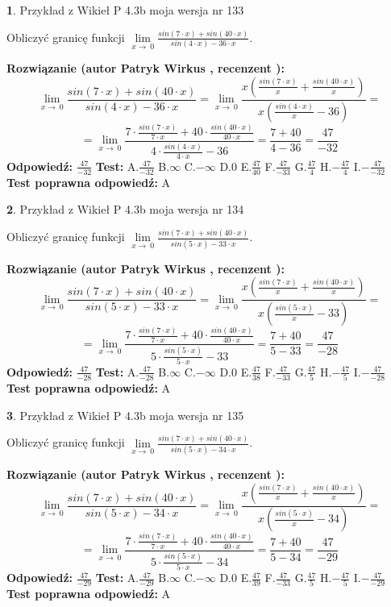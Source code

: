 \documentclass[12pt, a4paper]{article}
\theoremstyle{definition} %
\newtheorem{zad}{}
\newcommand{\zadStart}[1]{\begin{zad}#1\newline}
\newcommand{\zadStop}{\end{zad}}
\newcommand{\rozwStart}[2]{\noindent \textbf{Rozwiązanie (autor #1 , recenzent #2): }\newline}
\newcommand{\rozwStop}{\newline}
\newcommand{\odpStart}{\noindent \textbf{Odpowiedź:}\newline}
\newcommand{\odpStop}{\newline}
\newcommand{\testStart}{\noindent \textbf{Test:}\newline}
\newcommand{\testStop}{\newline}
\newcommand{\kluczStart}{\noindent \textbf{Test poprawna odpowiedź:}\newline}
\newcommand{\kluczStop}{\newline}
\begin{document}
\zadStart{Przykład z Wikieł P 4.3b moja wersja nr 133}


Obliczyć granicę funkcji $\lim\limits_{x\to\ 0}\frac{sin(7 \cdot x)+sin(40 \cdot x)}{sin(4 \cdot x)-36 \cdot x}$.
\zadStop
\rozwStart{Patryk Wirkus}{}
$$\lim\limits_{x\to\ 0}\frac{sin(7 \cdot x)+sin(40 \cdot x)}{sin(4 \cdot x)-36 \cdot x}=\lim\limits_{x\to\ 0}\frac{x(\frac{sin(7 \cdot x)}{x}+\frac{sin(40 \cdot x)}{x})}{x(\frac{sin(4 \cdot x)}{x}-36)}=$$
$$=\lim\limits_{x\to\ 0}\frac{7 \cdot \frac{sin(7 \cdot x)}{7 \cdot x}+40 \cdot \frac{sin(40 \cdot x)}{40 \cdot x}}{4 \cdot \frac{sin(4 \cdot x)}{4 \cdot x}-36}=\frac{7+40}{4-36} = \frac{47}{-32}$$
\rozwStop
\odpStart
$\frac{47}{-32}$
\odpStop
\testStart
A.$\frac{47}{-32}$
B.$\infty$
C.$-\infty$
D.$0$
E.$\frac{47}{40}$
F.$\frac{47}{-33}$
G.$\frac{47}{4}$
H.$-\frac{47}{4}$
I.$-\frac{47}{-32}$
\testStop
\kluczStart
A
\kluczStop



\zadStart{Przykład z Wikieł P 4.3b moja wersja nr 134}


Obliczyć granicę funkcji $\lim\limits_{x\to\ 0}\frac{sin(7 \cdot x)+sin(40 \cdot x)}{sin(5 \cdot x)-33 \cdot x}$.
\zadStop
\rozwStart{Patryk Wirkus}{}
$$\lim\limits_{x\to\ 0}\frac{sin(7 \cdot x)+sin(40 \cdot x)}{sin(5 \cdot x)-33 \cdot x}=\lim\limits_{x\to\ 0}\frac{x(\frac{sin(7 \cdot x)}{x}+\frac{sin(40 \cdot x)}{x})}{x(\frac{sin(5 \cdot x)}{x}-33)}=$$
$$=\lim\limits_{x\to\ 0}\frac{7 \cdot \frac{sin(7 \cdot x)}{7 \cdot x}+40 \cdot \frac{sin(40 \cdot x)}{40 \cdot x}}{5 \cdot \frac{sin(5 \cdot x)}{5 \cdot x}-33}=\frac{7+40}{5-33} = \frac{47}{-28}$$
\rozwStop
\odpStart
$\frac{47}{-28}$
\odpStop
\testStart
A.$\frac{47}{-28}$
B.$\infty$
C.$-\infty$
D.$0$
E.$\frac{47}{38}$
F.$\frac{47}{-33}$
G.$\frac{47}{5}$
H.$-\frac{47}{5}$
I.$-\frac{47}{-28}$
\testStop
\kluczStart
A
\kluczStop



\zadStart{Przykład z Wikieł P 4.3b moja wersja nr 135}


Obliczyć granicę funkcji $\lim\limits_{x\to\ 0}\frac{sin(7 \cdot x)+sin(40 \cdot x)}{sin(5 \cdot x)-34 \cdot x}$.
\zadStop
\rozwStart{Patryk Wirkus}{}
$$\lim\limits_{x\to\ 0}\frac{sin(7 \cdot x)+sin(40 \cdot x)}{sin(5 \cdot x)-34 \cdot x}=\lim\limits_{x\to\ 0}\frac{x(\frac{sin(7 \cdot x)}{x}+\frac{sin(40 \cdot x)}{x})}{x(\frac{sin(5 \cdot x)}{x}-34)}=$$
$$=\lim\limits_{x\to\ 0}\frac{7 \cdot \frac{sin(7 \cdot x)}{7 \cdot x}+40 \cdot \frac{sin(40 \cdot x)}{40 \cdot x}}{5 \cdot \frac{sin(5 \cdot x)}{5 \cdot x}-34}=\frac{7+40}{5-34} = \frac{47}{-29}$$
\rozwStop
\odpStart
$\frac{47}{-29}$
\odpStop
\testStart
A.$\frac{47}{-29}$
B.$\infty$
C.$-\infty$
D.$0$
E.$\frac{47}{39}$
F.$\frac{47}{-33}$
G.$\frac{47}{5}$
H.$-\frac{47}{5}$
I.$-\frac{47}{-29}$
\testStop
\kluczStart
A
\kluczStop
\end{document}
